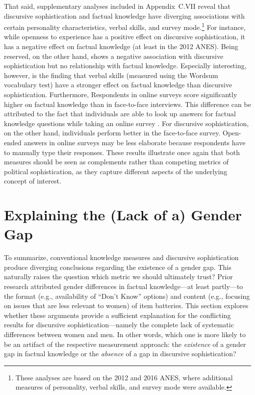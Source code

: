 That said, supplementary analyses included in Appendix~C.VII reveal that discursive sophistication and factual knowledge have diverging associations with certain personality characteristics, verbal skills, and survey mode.\footnote{These analyses are based on the 2012 and 2016 ANES, where additional measures of personality, verbal skills, and survey mode were available.} For instance, while openness to experience has a positive effect on discursive sophistication, it has a negative effect on factual knowledge (at least in the 2012 ANES). Being reserved, on the other hand, shows a negative association with discursive sophistication but no relationship with factual knowledge. Especially interesting, however, is the finding that verbal skills (measured using the Wordsum vocabulary test) have a stronger effect on factual knowledge than discursive sophistication. Furthermore, Respondents in online surveys score significantly higher on factual knowledge than in face-to-face interviews. This difference can be attributed to the fact that individuals are able to look up answers for factual knowledge questions while taking an online survey \citep{clifford2016cheating}. For discursive sophistication, on the other hand, individuals perform better in the face-to-face survey. Open-ended answers in online surveys may be less elaborate because respondents have to manually type their responses. These results illustrate once again that both measures should be seen as complements rather than competing metrics of political sophistication, as they capture different aspects of the underlying concept of interest. 


\section*{Explaining the (Lack of a) Gender Gap}

To summarize, conventional knowledge measures and discursive sophistication produce diverging conclusions regarding the existence of a gender gap. This naturally raises the question which metric we should ultimately trust? Prior research attributed gender differences in factual knowledge---at least partly---to the format (e.g., availability of ``Don't Know'' options) and content (e.g., focusing on issues that are less relevant to women) of item batteries. This section explores whether these arguments provide a sufficient explanation for the conflicting results for discursive sophistication---namely the complete lack of systematic differences between women and men. In other words, which one is more likely to be an artifact of the respective measurement approach: the \textit{existence} of a gender gap in factual knowledge or the \textit{absence} of a gap in discursive sophistication?

